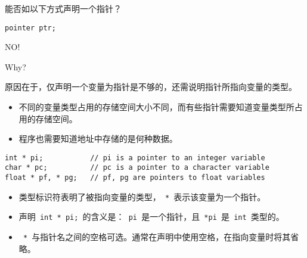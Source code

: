 \begin{frame}[fragile]
能否如以下方式声明一个指针？
\begin{lstlisting}[backgroundcolor=\color{blue!10}]
pointer ptr;
\end{lstlisting}
\pause \vspace{0.1in}

\begin{center}
{\Large NO!}
\end{center}
\pause\vspace{0.1in}

\begin{center}
{\Large Why?} 
\end{center}
\end{frame}

\begin{frame}[fragile]
原因在于，仅声明一个变量为指针是不够的，还需说明指针所指向变量的类型。
\vspace{0.1in}

\begin{itemize}
\item 不同的变量类型占用的存储空间大小不同，而有些指针需要知道变量类型所占用的存储空间。\\[0.1in]
\item 程序也需要知道地址中存储的是何种数据。
\end{itemize}
\end{frame}

\begin{frame}[fragile]
  \begin{lstlisting}[backgroundcolor=\color{blue!10}]
int * pi;           // pi is a pointer to an integer variable
char * pc;          // pc is a pointer to a character variable
float * pf, * pg;   // pf, pg are pointers to float variables
\end{lstlisting} \pause \vspace{0.1in}

\begin{itemize}
\item
类型标识符表明了被指向变量的类型，\lstinline| * |表示该变量为一个指针。\\[0.1in]
\item 
声明\lstinline| int * pi; |的含义是：\lstinline| pi |是一个指针，且\lstinline| *pi |是\lstinline| int |类型的。\\[0.1in]
\item 
\lstinline| * |与指针名之间的空格可选。通常在声明中使用空格，在指向变量时将其省略。
\end{itemize}
\end{frame}

